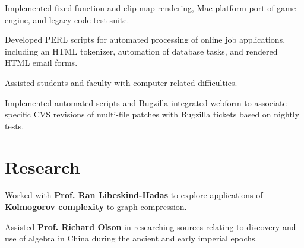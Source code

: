 \documentclass[]{jhearn-resume}
\begin{document}
\begin{minipage}[t]{0.65\textwidth}
\begin{tightemize}
\item Implemented fixed-function and clip map rendering, Mac platform port of game engine, and legacy code test suite.
\end{tightemize}
\sectionsep

\begin{tightemize}
\item Developed PERL scripts for automated processing of online job applications, including an HTML tokenizer, automation of database tasks, and rendered HTML email forms.
\item Assisted students and faculty with computer-related difficulties.
\end{tightemize}
\sectionsep

\begin{tightemize}
\item Implemented automated scripts and Bugzilla-integrated webform to
associate specific CVS revisions of multi-file patches with Bugzilla tickets based on nightly tests.
\end{tightemize}
\sectionsep

\section{Research}
\begin{tightemize}
\item Worked with \textbf{\href{https://www.cs.hmc.edu/~hadas/}{Prof. Ran Libeskind-Hadas}} to explore applications of \textbf{\href{https://en.wikipedia.org/wiki/Kolmogorov_complexity}{Kolmogorov complexity}} to graph compression.
\end{tightemize}
\sectionsep 

\begin{tightemize}
\item Assisted \textbf{\href{https://www.hmc.edu/hsa/hsa-faculty/emeritus-faculty/richard-olson/}{Prof. Richard Olson}} in researching sources relating to discovery and use of algebra in China during the ancient and early imperial epochs.
\end{tightemize}
\sectionsep

\end{minipage}
\end{document}
